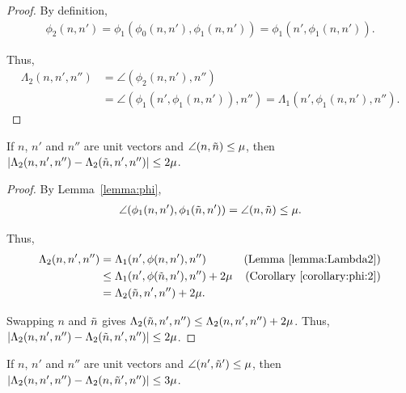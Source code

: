 \begin{proof}

By definition,
\begin{align*}
\phi_2(n,n') = \phi_1(\phi_0(n,n'), \phi_1(n,n')) = \phi_1(n', \phi_1(n,n')).
\end{align*}

Thus,
\begin{align*}
\Lambda_2(n,n',n'') & = \angle(\phi_2(n,n'),n'') \\
  & = \angle(\phi_1(n',\phi_1(n,n')), n'')  
    = \Lambda_1(n', \phi_1(n,n'), n'').
\end{align*}

\end{proof}

\begin{corollary}
If $n$, $n'$ and $n''$ are unit vectors
and $\angle(n,\tilde{n}) \le \mu$,
then $|\Lambda_2(n,n',n'') - \Lambda_2(\tilde{n},n',n'')| \le 2\mu$.
\label{corollary:Lambda2}
\end{corollary}

\begin{proof}

By Lemma~\ref{lemma:phi},
\begin{align*}
\angle(\phi_1(n,n'),\phi_1(\tilde{n},n')) = \angle(n,\tilde{n}) \le \mu.
\end{align*}

Thus,
\begin{align*}
\Lambda_2(n,n',n'') & = \Lambda_1(n', \phi(n,n'), n'') 
  & \mbox{(Lemma~\ref{lemma:Lambda2})} \\
& \le \Lambda_1(n', \phi(\tilde{n},n'), n'') + 2\mu
  & \mbox{(Corollary~\ref{corollary:phi:2})} \\
& = \Lambda_2(\tilde{n},n',n'') + 2 \mu.
\end{align*}

Swapping $n$ and $\tilde{n}$ gives
$\Lambda_2(\tilde{n},n',n'') \le \Lambda_2(n, n',n'') + 2 \mu$.
Thus,
$|\Lambda_2(n,n',n'') - \Lambda_2(\tilde{n}, n',n'')| \le 2 \mu$.
\end{proof}

\begin{corollary}
If $n$, $n'$ and $n''$ are unit vectors
and $\angle(n',\tilde{n}') \le \mu$,
then $|\Lambda_2(n,n',n'') - \Lambda_2(n,\tilde{n}',n'')| \le 3\mu$.
\label{corollary:Lambda2:2}
\end{corollary}


